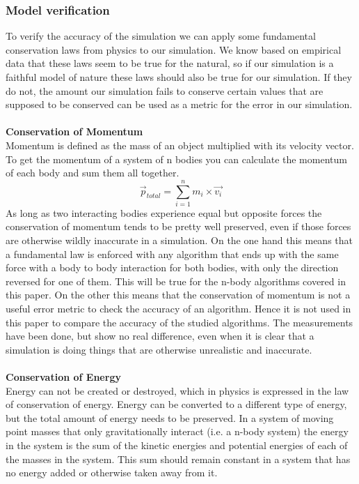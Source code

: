 \documentclass[11pt]{article} %
\begin{document}
\subsubsection{Model verification}
\label{verification}
To verify the accuracy of the simulation we can apply some fundamental conservation laws from physics to our simulation. We know based on empirical data that these laws seem to be true for the natural, so if our simulation is a faithful model of nature these laws should also be true for our simulation. If they do not, the amount our simulation fails to conserve certain values that are supposed to be conserved can be used as a metric for the error in our simulation.\\\\
\textbf{Conservation of Momentum}\\
Momentum is defined as the mass of an object multiplied with its velocity vector. To get the momentum of a system of n bodies you can calculate the momentum of each body and sum them all together.
\begin{equation}
    \vec{p}_{total} = \sum_{i=1}^n m_i \times \vec{v_i}
\end{equation}
As long as two interacting bodies experience equal but opposite forces the conservation of momentum tends to be pretty well preserved, even if those forces are otherwise wildly inaccurate in a simulation. On the one hand this means that a fundamental law is enforced with any algorithm that ends up with the same force with a body to body interaction for both bodies, with only the direction reversed for one of them. This will be true for the n-body algorithms covered in this paper. On the other this means that the conservation of momentum is not a useful error metric to check the accuracy of an algorithm. Hence it is not used in this paper to compare the accuracy of the studied algorithms. The measurements have been done, but show no real difference, even when it is clear that a simulation is doing things that are otherwise unrealistic and inaccurate.\\\\
\textbf{Conservation of Energy}\\
Energy can not be created or destroyed, which in physics is expressed in the law of conservation of energy. Energy can be converted to a different type of energy, but the total amount of energy needs to be preserved. In a system of moving point masses that only gravitationally interact (i.e. a n-body system) the energy in the system is the sum of the kinetic energies and potential energies of each of the masses in the system. This sum should remain constant in a system that has no energy added or otherwise taken away from it. \\\\
\end{document}
